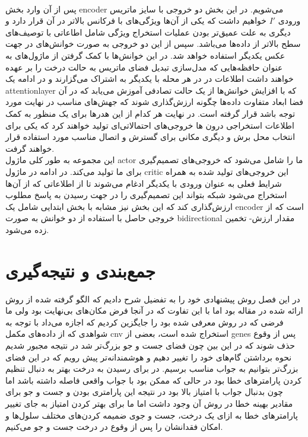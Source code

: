 \\
پس از آن وارد بخش \gls{encoder} می‌شویم. در این بخش دو خروجی با سایز ماتریس ورودی $I'$ خواهیم داشت که یکی از آن‌ها ویژگی‌های با فرکانس بالاتر در آن قرار دارد و دیگری به علت عمیق‌تر بودن عملیات استخراج ویژگی شامل اطاعاتی با توصیف‌های سطح بالاتر از داده‌ها می‌باشد. سپس از این دو خروجی به صورت خوانش‌های در جهت عکس یکدیگر استفاده خواهد شد. در این خوانش‌ها با کمک گرفتن از ماژول‌های  به عنوان حافظه‌هایی که مدل‌سازی تبدیل فضای ماتریس به حالت درخت را بر عهده خواهند داشت اطلاعات در در هر محله با یکدیگر به اشتراک می‌گزارند و در ادامه یک \gls{attentionlayer} که با افزایش خوانش‌ها از یک حالت تصادفی آموزش می‌یابد که در آن فضا ابعاد متفاوت داده‌ها چگونه ارزش‌گذاری شوند که جهش‌‌های مناسب در نهایت مورد توجه باشد قرار گرفته است. در نهایت هر کدام از این هدرها برای یک منظور به کمک اطلاعات استخراجی درون ها خروجی‌های احتمالاتی‌ای تولید خواهند کرد که یکی برای انتخاب محل برش و دیگری مکانی برای گسترش و اتصال مناسب مورد استفاده قرار خواهند گرفت.
\\
این مجموعه به طور کلی ماژول \gls{actor} ما را شامل می‌شود که خروجی‌های تصمیم‌گیری برای ما تولید می‌کند. در ادامه در ماژول \gls{critic} این خروجی‌های تولید شده به همراه شرایط فعلی به عنوان ورودی با یکدیگر ادغام می‌شوند تا از اطلاعاتی که از آن‌ها استخراج می‌شود شبکه بتواند این تصمیم‌گیری را در جهت رسیدن به پاسخ مطلوب ارزش‌گذاری کند که این بخش نیز مشابه با بخش ابتدایی شامل یک \gls{encoder} است که از خروجی حاصل با استفاده از دو خوانش به صورت \gls{bidirectional} مقدار ارزش- تخمین زده می‌شود.


\section{جمع‌بندی و نتیجه‌گیری}
در این فصل روش پیشنهادی خود را به تفضیل شرح دادیم که الگو گرفته شده از روش ارائه شده در مقاله  بود اما با این تفاوت که در آنجا فرض مکان‌های بی‌نهایت بود ولی ما فرضی که در روش  معرفی شده بود را جایگزین کردیم که اجازه می‌داد با توجه به شواهدی که از داده‌های مکمل \gls{cnv} استخراج شده است، بعضی از \glspl{gene} پس از وقوع حذف شوند که در این بین چون فضای جست و جو بزرگ‌تر شد در نتیجه مجبور شدیم نحوه برداشتن گام‌های خود را تغییر دهیم و هوشمندانه‌تر پیش رویم که در این فضای بزرگ‌تر بتوانیم به جواب مناسب برسیم. در  برای رسیدن به درخت بهتر به دنبال تنظیم کردن پارامترهای خطا بود در حالی که ممکن بود با جواب واقعی فاصله داشته باشد اما چون بدنبال جواب با امتیاز بالا بود در نتیجه این پارامتری بودن و جست و جو برای مقادیر بهینه خطا در روش آن وجود داشت اما ما برای بهتر کردن امتیاز به جای تغییر پارامترهای خطا به ازای یک درخت، جست و جوی ضمیمه کردن‌های مختلف سلول‌ها و امکان فقدانشان را پس از وقوع در درخت جست و جو می‌کنیم.








